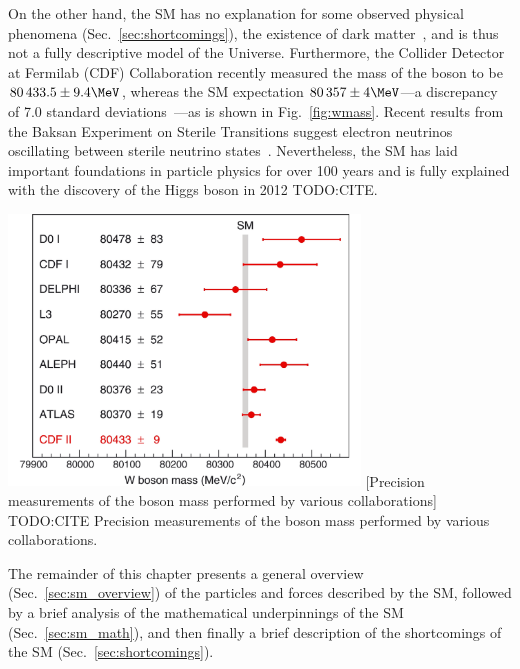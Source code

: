 On the other hand, the SM has no explanation for some observed physical phenomena (Sec.~\ref{sec:shortcomings}), \eg the existence of dark matter~\cite{particle_data_group_review_2020}, and is thus not a fully descriptive model of the Universe.
Furthermore, the Collider Detector at Fermilab (CDF) Collaboration recently measured the mass of the \PW boson to be $80\,433.5 \pm 9.4\MeV$, whereas the SM expectation $80\,357 \pm 4\MeV$---a discrepancy of 7.0 standard deviations~\cite{cdf_collaboration_high-precision_2022}---as is shown in Fig.~\ref{fig:wmass}.
Recent results from the Baksan Experiment on Sterile Transitions suggest electron neutrinos oscillating between sterile neutrino states~\cite{PhysRevLett.128.232501}.
Nevertheless, the SM has laid important foundations in particle physics for over 100 years and is fully explained with the discovery of the Higgs boson in 2012 TODO:CITE.
\begin{multiFigure}
    \centering
    \includegraphics[width=0.7\textwidth,keepaspectratio]{figures/sm/wmass.pdf}
        [Precision measurements of the \PW boson mass performed by various collaborations]
        {TODO:CITE Precision measurements of the \PW boson mass performed by various collaborations.} 
    \label{fig:wmass}
\end{multiFigure}

The remainder of this chapter presents a general overview (Sec.~\ref{sec:sm_overview}) of the particles and forces described by the SM,
followed by a brief analysis of the mathematical underpinnings of the SM (Sec.~\ref{sec:sm_math}),
and then finally a brief description of the shortcomings of the SM (Sec.~\ref{sec:shortcomings}).

